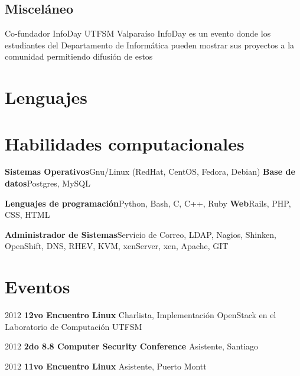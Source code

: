 \documentclass[11pt,a4paper,sans]{moderncv}
\begin{document}
\subsection{Misceláneo}
                                {Co-fundador InfoDay}
                                {UTFSM}
                                {Valparaíso}
                                {}
                                {InfoDay es un evento donde los estudiantes del Departamento de Informática pueden mostrar sus
                                proyectos a la comunidad permitiendo difusión de estos}

\section{Lenguajes}

\newpage

\section{Habilidades computacionales}
\cvdoubleitem
                {\textbf{Sistemas Operativos}}{Gnu/Linux (RedHat, CentOS, Fedora, Debian)}
                {\textbf{Base de datos}}{Postgres, MySQL}

\cvdoubleitem
                {\textbf{Lenguajes de programación}}{Python, Bash, C, C++, Ruby}
                {\textbf{Web}}{Rails, PHP, CSS, HTML}

\cvitem
                {\textbf{Administrador de Sistemas}}{Servicio de Correo, LDAP, Nagios,
                Shinken, OpenShift, DNS, RHEV, KVM, xenServer, xen, Apache, GIT}

\section{Eventos}
\cvitem
        {2012}
        {\textbf{12vo Encuentro Linux}
        Charlista, Implementación OpenStack en el Laboratorio de Computación UTFSM}

\cvitem
        {2012}
        {\textbf{2do 8.8 Computer Security Conference}
        Asistente, Santiago}

\cvitem
        {2012}
        {\textbf{11vo Encuentro Linux}
        Asistente, Puerto Montt}
\end{document}

